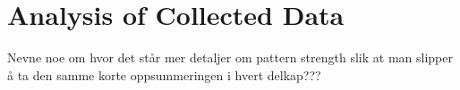 \chapter{Analysis of Collected Data}\label{chap:analysis}

	Nevne noe om hvor det står mer detaljer om pattern strength slik at man slipper å ta den samme korte oppsummeringen i hvert delkap???

	